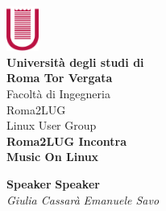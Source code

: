 \documentclass{beamer}
\begin{document}
\begin{frame}[plain]
\begin{center}
\includegraphics[width=0.08\textwidth]{imgs/logo-uniroma2-red.png}
\\    
\textbf{\color{RaspberryPi} Università  degli studi di \\Roma Tor Vergata}
\\[0.2cm]
\tiny Facoltà di Ingegneria
\\[0.2cm]
\small Roma2LUG
\\
\tiny Linux User Group
\\[0.2cm]


\vfill
{
\Large \textbf{Roma2LUG Incontra}
\\[0.2cm]
\color{RaspberryPi}\Large \textbf{Music On Linux}
\\[1.0cm]
}
\vfill

\small{
\textbf{Speaker}
\hfill
\textbf{Speaker}
\\
\textit{Giulia Cassarà}
\hfill
\textit{Emanuele Savo}}


\end{center}

\end{frame}




\lstset{escapechar=@,style=customc}


\end{document}

